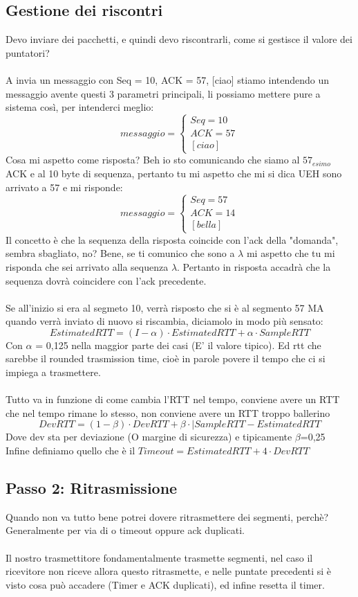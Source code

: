 \documentclass[12pt, a4paper, openany, twoside]{book}
\begin{document}
\subsection{Gestione dei riscontri}
Devo inviare dei pacchetti, e quindi devo riscontrarli, come si gestisce il 
valore dei puntatori? \\ \\
A invia un messaggio con Seq = 10, ACK = 57, [ciao] stiamo intendendo un messaggio
avente questi 3 parametri principali, li possiamo mettere pure a sistema così, 
per intenderci meglio:
\[
messaggio =
\begin{cases}
Seq = 10 \\
ACK = 57 \\
[ciao]
\end{cases}
\]	
Cosa mi aspetto come risposta? Beh io sto comunicando che siamo al $57_{esimo}$
ACK e al 10 byte di sequenza, pertanto tu mi aspetto che mi si dica UEH sono
arrivato a 57 e mi risponde:
\[
messaggio =
\begin{cases}
Seq = 57 \\
ACK = 14 \\
[bella]
\end{cases}
\]	
Il concetto è che la sequenza della risposta coincide con l'ack della "domanda",
sembra sbagliato, no? Bene, se ti comunico che sono a $\lambda$ mi aspetto che
tu mi risponda che sei arrivato alla sequenza $\lambda$. Pertanto in risposta
accadrà che la sequenza dovrà coincidere con l'ack precedente. \\ \\
Se all'inizio si era al segmeto 10, verrà risposto che si è al segmento 57 MA
quando verrà inviato di nuovo si riscambia, diciamolo in modo più sensato:
\[
EstimatedRTT = (I - \alpha) \cdot EstimatedRTT + \alpha \cdot SampleRTT 
\]
Con $\alpha$ = 0,125 nella maggior parte dei casi (E' il valore tipico).
Ed rtt che sarebbe il rounded
trasmission time, cioè in parole povere il tempo che ci si impiega a trasmettere.
\\ \\
Tutto va in funzione di come cambia l'RTT nel tempo, conviene avere un RTT che 
nel tempo rimane lo stesso, non conviene avere un RTT troppo ballerino
\[
DevRTT = (1 - \beta) \cdot DevRTT + \beta \cdot | SampleRTT - EstimatedRTT
\]
Dove dev sta per deviazione (O margine di sicurezza) e tipicamente $\beta$=0,25\\
Infine definiamo quello che è il $Timeout = EstimatedRTT + 4\cdot DevRTT$
\subsection{Passo 2: Ritrasmissione}
Quando non va tutto bene potrei dovere ritrasmettere dei segmenti, perchè? 
Generalmente per via di o timeout oppure ack duplicati.
\\ \\
Il nostro trasmettitore fondamentalmente trasmette segmenti, nel caso il 
ricevitore non riceve allora questo ritrasmette, e nelle puntate precedenti si è
visto cosa può accadere (Timer e ACK duplicati), ed infine resetta il timer.
\\ \\
\end{document}
